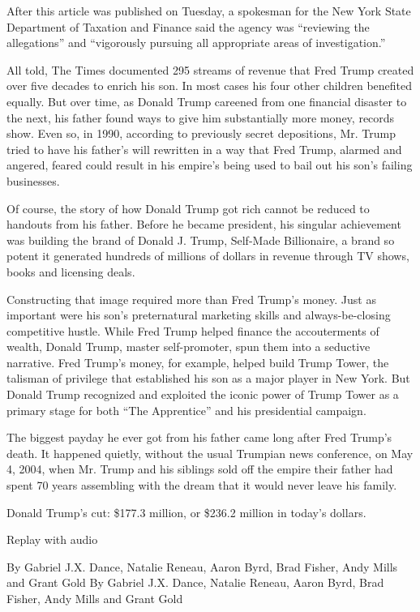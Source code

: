 After this article was published on Tuesday, a spokesman for the New
York State Department of Taxation and Finance said the agency was
``reviewing the allegations'' and ``vigorously pursuing all appropriate
areas of investigation.''

All told, The Times documented 295 streams of revenue that Fred Trump
created over five decades to enrich his son. In most cases his four
other children benefited equally. But over time, as Donald Trump
careened from one financial disaster to the next, his father found ways
to give him substantially more money, records show. Even so, in 1990,
according to previously secret depositions, Mr. Trump tried to have his
father's will rewritten in a way that Fred Trump, alarmed and angered,
feared could result in his empire's being used to bail out his son's
failing businesses.

Of course, the story of how Donald Trump got rich cannot be reduced to
handouts from his father. Before he became president, his singular
achievement was building the brand of Donald J. Trump, Self-Made
Billionaire, a brand so potent it generated hundreds of millions of
dollars in revenue through TV shows, books and licensing deals.

Constructing that image required more than Fred Trump's money. Just as
important were his son's preternatural marketing skills and
always-be-closing competitive hustle. While Fred Trump helped finance
the accouterments of wealth, Donald Trump, master self-promoter, spun
them into a seductive narrative. Fred Trump's money, for example, helped
build Trump Tower, the talisman of privilege that established his son as
a major player in New York. But Donald Trump recognized and exploited
the iconic power of Trump Tower as a primary stage for both ``The
Apprentice'' and his presidential campaign.

The biggest payday he ever got from his father came long after Fred
Trump's death. It happened quietly, without the usual Trumpian news
conference, on May 4, 2004, when Mr. Trump and his siblings sold off the
empire their father had spent 70 years assembling with the dream that it
would never leave his family.

Donald Trump's cut: \$177.3 million, or \$236.2 million in today's
dollars.

Replay with audio

By Gabriel J.X. Dance, Natalie Reneau, Aaron Byrd, Brad Fisher, Andy
Mills and Grant Gold By Gabriel J.X. Dance, Natalie Reneau, Aaron Byrd,
Brad Fisher, Andy Mills and Grant Gold

